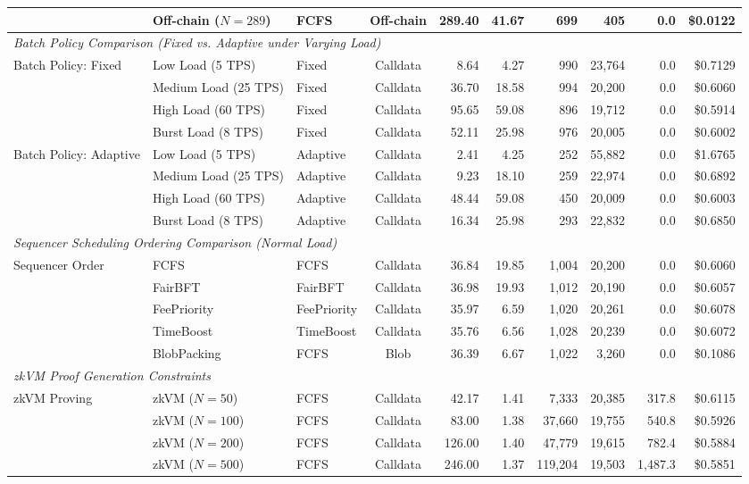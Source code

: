 \begin{table}[t]
{\begin{tabular}{lllcrrrrrr}
			& Off-chain ($N=289$) & FCFS & Off-chain & 289.40 & 41.67 & 699 & 405 & 0.0 & \$0.0122 \\
			\midrule
			\multicolumn{10}{l}{\textit{Batch Policy Comparison (Fixed vs. Adaptive under Varying Load)}} \\
			Batch Policy: Fixed & Low Load (5 TPS) & Fixed & Calldata & 8.64 & 4.27 & 990 & 23,764 & 0.0 & \$0.7129 \\
			& Medium Load (25 TPS) & Fixed & Calldata & 36.70 & 18.58 & 994 & 20,200 & 0.0 & \$0.6060 \\
			& High Load (60 TPS) & Fixed & Calldata & 95.65 & 59.08 & 896 & 19,712 & 0.0 & \$0.5914 \\
			& Burst Load (8 TPS) & Fixed & Calldata & 52.11 & 25.98 & 976 & 20,005 & 0.0 & \$0.6002 \\
			\midrule
			Batch Policy: Adaptive & Low Load (5 TPS) & Adaptive & Calldata & 2.41 & 4.25 & 252 & 55,882 & 0.0 & \$1.6765 \\
			& Medium Load (25 TPS) & Adaptive & Calldata & 9.23 & 18.10 & 259 & 22,974 & 0.0 & \$0.6892 \\
			& High Load (60 TPS) & Adaptive & Calldata & 48.44 & 59.08 & 450 & 20,009 & 0.0 & \$0.6003 \\
			& Burst Load (8 TPS) & Adaptive & Calldata & 16.34 & 25.98 & 293 & 22,832 & 0.0 & \$0.6850 \\
			\midrule
			\multicolumn{10}{l}{\textit{Sequencer Scheduling Ordering Comparison (Normal Load)}} \\
			Sequencer Order & FCFS & FCFS & Calldata & 36.84 & 19.85 & 1,004 & 20,200 & 0.0 & \$0.6060 \\
			& FairBFT & FairBFT & Calldata & 36.98 & 19.93 & 1,012 & 20,190 & 0.0 & \$0.6057 \\
			& FeePriority & FeePriority & Calldata & 35.97 & 6.59 & 1,020 & 20,261 & 0.0 & \$0.6078 \\
			& TimeBoost & TimeBoost & Calldata & 35.76 & 6.56 & 1,028 & 20,239 & 0.0 & \$0.6072 \\
			& BlobPacking & FCFS & Blob & 36.39 & 6.67 & 1,022 & 3,260 & 0.0 & \$0.1086 \\
			\midrule
			\multicolumn{10}{l}{\textit{zkVM Proof Generation Constraints}} \\
			zkVM Proving & zkVM ($N=50$) & FCFS & Calldata & 42.17 & 1.41 & 7,333 & 20,385 & 317.8 & \$0.6115 \\
			& zkVM ($N=100$) & FCFS & Calldata & 83.00 & 1.38 & 37,660 & 19,755 & 540.8 & \$0.5926 \\
			& zkVM ($N=200$) & FCFS & Calldata & 126.00 & 1.40 & 47,779 & 19,615 & 782.4 & \$0.5884 \\
			& zkVM ($N=500$) & FCFS & Calldata & 246.00 & 1.37 & 119,204 & 19,503 & 1,487.3 & \$0.5851 \\
			\bottomrule
		\end{tabular}%
	}
\end{table}